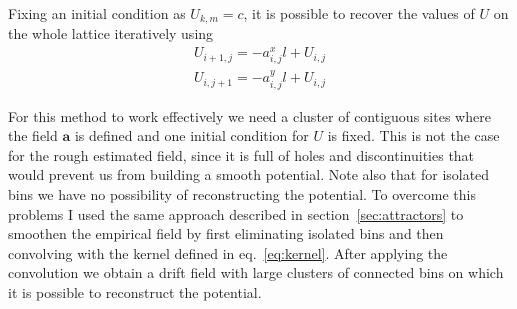 \documentclass[a4paper]{article}
\begin{document}
Fixing an initial condition as $U_{k,m} = c$, it is possible to recover the values of $U$ on the whole lattice iteratively using
\begin{align}
U_{i+1,j} = -a^x_{i,j}l + U_{i,j} \\[10pt]
U_{i,j+1} = -a^y_{i,j}l + U_{i,j}
\end{align}

For this method to work effectively we need a cluster of contiguous sites where the field $\bm{a}$ is defined and one initial condition for $U$ is fixed. This is not the case for the rough estimated field, since it is full of holes and discontinuities that would prevent us from building a smooth potential. Note also that for isolated bins we have no possibility of reconstructing the potential. To overcome this problems I used the same approach described in section~\ref{sec:attractors} to smoothen the empirical field by first eliminating isolated bins and then convolving with the kernel defined in eq.~\ref{eq:kernel}. After applying the convolution we obtain a drift field with large clusters of connected bins on which it is possible to reconstruct the potential.
\end{document}
